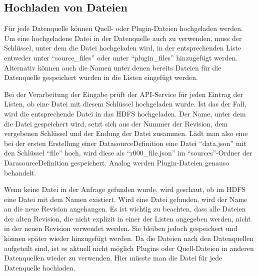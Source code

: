 \subsection{Hochladen von Dateien}

Für jede Datenquelle können Quell- oder Plugin-Dateien hochgeladen werden.
Um eine hochgeladene Datei in der Datenquelle auch zu verwenden, muss der Schlüssel, unter dem die Datei hochgeladen wird, in der entsprechenden Liste entweder unter "`source\_files"' oder unter "`plugin\_files"' hinzugefügt werden.
Alternativ können auch die Namen unter denen bereits Dateien für die Datenquelle gespeichert wurden in die Listen eingefügt werden.

Bei der Verarbeitung der Eingabe prüft der API-Service für jeden Eintrag der Listen, ob eine Datei mit diesem Schlüssel hochgeladen wurde.
Ist das der Fall, wird die entsprechende Datei in das HDFS hochgeladen.
Der Name, unter dem die Datei gespeichert wird, setzt sich aus der Nummer der Revision, dem vergebenen Schlüssel und der Endung der Datei zusammen.
Lädt man also eine bei der ersten Erstellung einer DatasourceDefinition eine Datei "`data.json"' mit den Schlüssel "`file"' hoch, wird diese als "`r000\_file.json"' im "`sources"'-Ordner der DarasourceDefinition gespeichert.
Analog werden Plugin-Dateien genauso behandelt.

Wenn keine Datei in der Anfrage gefunden wurde, wird geschaut, ob im HDFS eine Datei mit dem Namen existiert.
Wird eine Datei gefunden, wird der Name an die neue Revision angehangen.
Es ist wichtig zu beachten, dass alle Dateien der alten Revision, die nicht explizit in einer der Listen angegeben werden, nicht in der neuen Revision verwendet werden.
Sie bleiben jedoch gespeichert und können später wieder hinzugefügt werden.
Da die Dateien nach den Datenquellen aufgeteilt sind, ist es aktuell nicht möglich Plugins oder Quell-Dateien in anderen Datenquellen wieder zu verwenden.
Hier müsste man die Datei für jede Datenquelle hochladen.
